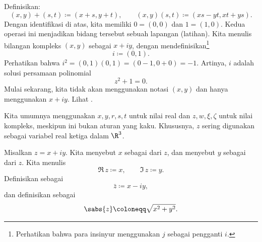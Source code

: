 Definisikan:
\begin{equation*}
(x,y) + (s,t) \coloneqq (x+s,y+t) , \qquad
(x,y) (s,t) \coloneqq (xs-yt,xt+ys) .
\end{equation*}
Dengan identifikasi di atas, kita memiliki $0 = (0,0)$ dan $1 = (1,0)$.
Kedua operasi ini menjadikan bidang tersebut sebuah lapangan (latihan).
Kita menulis bilangan kompleks $(x,y)$ sebagai $x+iy$, dengan
mendefinisikan\footnote{Perhatikan bahwa para insinyur menggunakan $j$ sebagai pengganti $i$.}
\begin{equation*}
i \coloneqq (0,1) .
\end{equation*}
Perhatikan bahwa $i^2 = (0,1)(0,1) = (0-1,0+0) = -1$.
Artinya, $i$ adalah solusi persamaan polinomial
\begin{equation*}
z^2+1=0 .
\end{equation*}
Mulai sekarang, kita tidak akan menggunakan notasi $(x,y)$ dan hanya menggunakan $x+iy$.
Lihat .
\begin{myfigureht}
\caption{Titik-titik $1$, $i$, $x$, $iy$, dan $x+iy$ pada bidang
kompleks.\label{fig:complexplane}}
\end{myfigureht}

Kita umumnya menggunakan $x,y,r,s,t$ untuk nilai real dan $z,w,\xi,\zeta$
untuk nilai kompleks, meskipun ini bukan aturan yang kaku. Khususnya,
$z$ sering digunakan sebagai variabel real ketiga dalam $\R^3$.

\begin{defn}
Misalkan $z= x+iy$.
Kita menyebut $x$ 
sebagai \emph{} dari $z$, dan 
menyebut $y$
sebagai \emph{} dari $z$. Kita menulis
\begin{equation*}
\Re\, z \coloneqq x , \qquad
\Im\, z \coloneqq y .
\end{equation*}
Definisikan
\emph{} sebagai
\begin{equation*}
\bar{z} \coloneqq x-iy ,
\end{equation*}
dan definisikan \emph{} sebagai
\begin{equation*}
\sabs{z} \coloneqq \sqrt{x^2+y^2} .
\end{equation*}
\end{defn}

